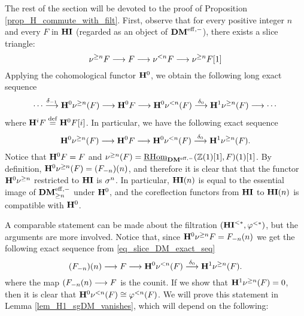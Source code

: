 The rest of the section will be devoted to the proof of
Proposition \ref{prop_H_commute_with_filt}. 
First, observe that for every positive integer $n$ and every $F$ 
in $\HI$ (regarded as an object of $\DMeff$), there exists a slice 
triangle:
\[
\sliceTriangle{n}{F}
\]
Applying the cohomological functor $\HH^0$, we obtain the
following long exact sequence
\[
\cdots \stackrel{\delta_{-1}}{\to} \HH^0 \sgDM{n}(F) \to 
   \HH^0 F \to \HH^0 \slDM{n}(F)
   \stackrel{\delta_0}{\to} \HH^1 \sgDM{n}(F) \to \cdots
\]
where $\HH^i F \defeq \HH^0F[i]$. In particular, we
have the following exact sequence
\begin{equation}\label{eq_slice_DM_exact_seq}
\HH^0 \sgDM{n}(F) \to \HH^0 F \to \HH^0 
\slDM{n}(F) \stackrel{\delta_0}{\to} \HH^1 \sgDM{n}(F).
\end{equation}
Notice that $\HH^0F = F$ and $\sgDM{n}(F) = 
\ihomDMf(\Z(1)[1], F)(1)[1]$. By definition, $\HH^0 \sgDM{n}(F) 
= \LHI[n]{(\RHI[n]{F})}$, and therefore it is clear that
that the functor $\HH^0 \sgDM{n}$ restricted to $\HI$ is 
$\sgHI{n}$. In particular, $\HI(n)$ is equal to the essential
image of $\GFiltDM[n]{\DMeff}$ under $\HH^0$, and the coreflection 
functors from $\HI$ to $\HI(n)$ is compatible with $\HH^0$.

A comparable statement can be made about the filtration 
$(\TFHI{*}, \tlHI{*})$, but the arguments are more involved.
Notice that, since $\HH^0\sgDM{n}F = \LHI[n]{\RHI[n]{F}}$ we get 
the following exact sequence from \eqref{eq_slice_DM_exact_seq}
\[
\LHI[n]{(\RHI[n]{F})} \to F \to \HH^0{\slDM{n}(F)} 
   \stackrel{\delta_0}{\to} \HH^1 \sgDM{n}(F).
\]
where the map $\LHI[n]{(\RHI[n]{F}} \to F$ is the counit. If we 
show that $\HH^1 \sgDM{n}(F) = 0$, then it is clear that
$\HH^0 \slDM{n}(F) \cong \tlHI{n}(F)$. We will prove this 
statement in Lemma \ref{lem_H1_sgDM_vanishes}, which will depend
on the following:

